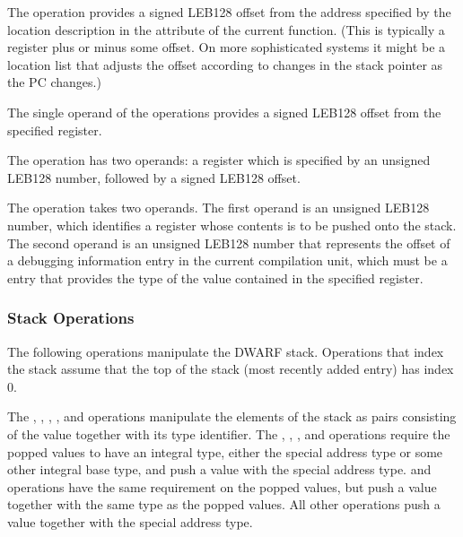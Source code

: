 \begin{enumerate}[1. ]
\itembfnl{\DWOPfbregTARG}
The \DWOPfbregNAME{} operation provides a 
signed LEB128 offset
from the address specified by the location description in the
\DWATframebase{} attribute of the current function. (This
is typically a  register plus or minus
some offset. On more sophisticated systems it might be a
location list that adjusts the offset according to changes
in the stack pointer as the PC changes.)

\itembfnl{\DWOPbregzeroTARG, \DWOPbregoneTARG, \dots, \DWOPbregthirtyoneTARG}
The single operand of the \DWOPbregnTARG{} 
operations provides
a signed LEB128 offset from
the specified register.

\itembfnl{\DWOPbregxTARG}
The \DWOPbregxNAME{} operation has two operands: a register
which is specified by an unsigned LEB128
number, followed by a signed LEB128 offset.

\itembfnl{\DWOPregvaltypeTARG}
The \DWOPregvaltypeNAME{} operation takes two operands. The first 
operand is an unsigned LEB128 number, 
which identifies a register whose contents is to
be pushed onto the stack. The second operand is an 
unsigned LEB128 number
that represents the offset of a debugging information entry in the current
compilation unit, which must be a \DWTAGbasetype{} entry that provides the
type of the value contained in the specified register.

\end{enumerate}

\subsubsection{Stack Operations}
\label{chap:stackoperations}
The following 
operations manipulate the DWARF stack. Operations
that index the stack assume that the top of the stack (most
recently added entry) has index 0.

The \DWOPdup{}, \DWOPdrop{}, \DWOPpick{}, \DWOPover{}, \DWOPswap{}
and \DWOProt{} operations manipulate the elements of the stack as pairs
consisting of the value together with its type identifier. 
The \DWOPderef{}, \DWOPderefsize{}, \DWOPxderef{}, \DWOPxderefsize{} 
and \DWOPformtlsaddress{}
operations require the popped values to have an integral type, either the
special address type or some other integral base type, and push a 
value with the special address type.  
\DWOPdereftype{} and \DWOPxdereftype{} operations have the
same requirement on the popped values, but push a value together 
with the same type as the popped values.
All other operations push a value together with the special address type.

